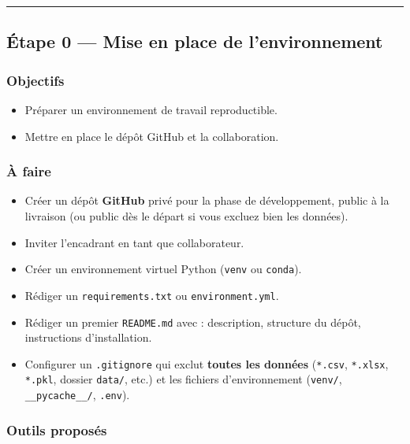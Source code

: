 \documentclass[11pt,a4paper]{article}
\providecommand{\tightlist}{\setlength{\itemsep}{0pt}\setlength{\parskip}{0pt}}
\begin{document}
\begin{center}\rule{0.5\linewidth}{0.5pt}\end{center}

\subsection{Étape 0 --- Mise en place de
l'environnement}\label{uxe9tape-0-mise-en-place-de-lenvironnement}

\subsubsection{Objectifs}\label{objectifs}

\begin{itemize}
\tightlist
\item
  Préparer un environnement de travail reproductible.
\item
  Mettre en place le dépôt GitHub et la collaboration.
\end{itemize}

\subsubsection{À faire}\label{uxe0-faire}

\begin{itemize}
\tightlist
\item
  Créer un dépôt \textbf{GitHub} privé pour la phase de développement,
  public à la livraison (ou public dès le départ si vous excluez bien
  les données).
\item
  Inviter l'encadrant en tant que collaborateur.
\item
  Créer un environnement virtuel Python (\texttt{venv} ou
  \texttt{conda}).
\item
  Rédiger un \texttt{requirements.txt} ou \texttt{environment.yml}.
\item
  Rédiger un premier \texttt{README.md} avec : description, structure du
  dépôt, instructions d'installation.
\item
  Configurer un \texttt{.gitignore} qui exclut \textbf{toutes les
  données} (\texttt{*.csv}, \texttt{*.xlsx}, \texttt{*.pkl}, dossier
  \texttt{data/}, etc.) et les fichiers d'environnement (\texttt{venv/},
  \texttt{\_\_pycache\_\_/}, \texttt{.env}).
\end{itemize}

\subsubsection{Outils proposés}\label{outils-proposuxe9s}
\end{document}
